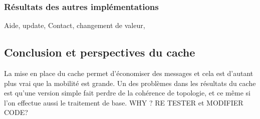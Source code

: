 \subsubsection{Résultats des autres implémentations}

Aide, update, Contact, changement de valeur, 


\subsection{Conclusion et perspectives du cache} 

La mise en place du cache permet d'économiser des messages et cela est d'autant plus vrai que la mobilité est grande. Un des problèmes dans les résultats du cache est qu'une version simple fait perdre de la cohérence de topologie, et ce même si l'on effectue aussi le traitement de base. WHY ? RE TESTER et MODIFIER CODE?

